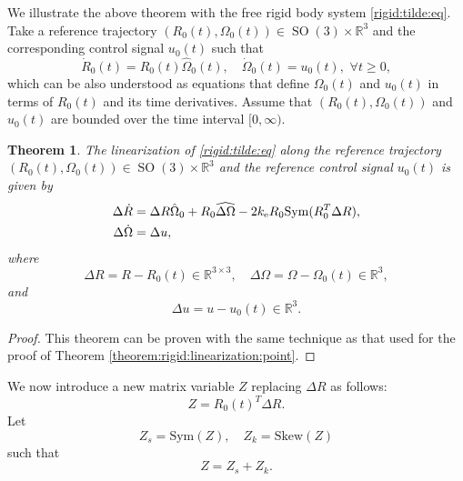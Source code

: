 \documentclass[letterpaper, 10 pt, conference]{ieeeconf}  %
\newtheorem{theorem}{Theorem}[section]
\newcommand{\Sym}{\mathrm{Sym}}
\newcommand{\Skew}{\mathrm{Skew}}
\newcommand{\SO}{\operatorname{SO}(3)}
\newcommand{\coV}{{k_{\rm e}}}
\begin{document}
We illustrate the above theorem with the free rigid body system \eqref{rigid:tilde:eq}. Take a reference trajectory $(R_0(t), \Omega_0 (t)) \in \SO \times \mathbb R^3$ and the corresponding control signal $u_0(t)$ such that 
\begin{equation}\label{ref:traj:rigid}
\dot R_0(t) = R_0(t)\hat \Omega_0 (t), \quad \dot \Omega_0 (t) = u_0(t), \,\, \forall t \geq 0,
\end{equation}
which can be also understood as equations that define $\Omega_0(t)$ and $u_0(t)$ in terms of $R_0(t)$ and its time derivatives. Assume that  $(R_0(t), \Omega_0(t))$ and $u_0(t)$ are bounded  over the time interval $[0,\infty )$.
\begin{theorem}
The linearization of \eqref{rigid:tilde:eq} along the reference trajectory $(R_0(t),\Omega_0(t)) \in \SO \times \mathbb R^3$ and the reference control signal $u_0(t)$ is given by
\begin{subequations}\label{rigid:tilde:ell}
\begin{align}
\Delta \dot R &= \Delta R \hat\Omega_0+ R_0 \widehat{\Delta \Omega} - 2\coV  R_0 \Sym (R_0^T\Delta R),\\
\Delta\dot \Omega &= \Delta u,
\end{align}
\end{subequations}
where
\[
\Delta R = R - R_0(t) \in \mathbb R^{3\times 3}, \quad \Delta \Omega = \Omega - \Omega_0(t) \in \mathbb R^3,
\]
and
\[
 \Delta u = u - u_0(t) \in \mathbb R^3.
 \]
 

\end{theorem}
 \begin{proof}
This theorem can be proven with the same technique as that used for the proof of Theorem \ref{theorem:rigid:linearization:point}.
 \end{proof}

We now introduce a new matrix variable $Z$ replacing $\Delta R$ as follows:
\begin{equation}\label{ZR0R}
Z = R_0(t)^T \Delta R.
\end{equation}
 Let
\begin{equation}\label{def:Zs}
Z_s = \Sym (Z), \quad Z_k=\Skew (Z)
\end{equation}
such that 
\begin{equation}\label{def:Zk}
Z = Z_s + Z_k.
\end{equation}
\end{document}
